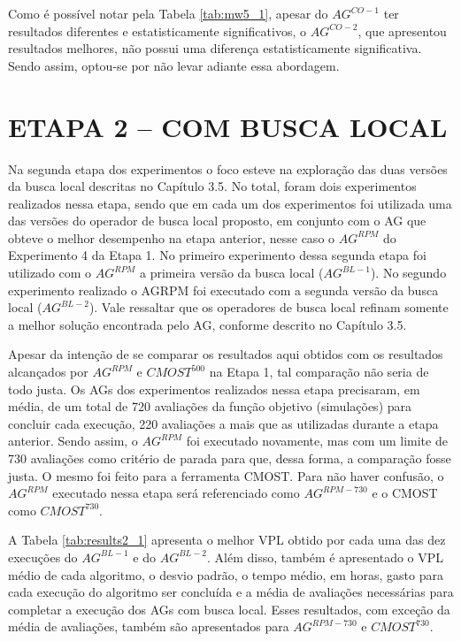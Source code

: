 Como é possível notar pela Tabela \ref{tab:mw5_1}, apesar do $AG^{CO-1}$ ter resultados diferentes e estatisticamente significativos, o $AG^{CO-2}$, que apresentou resultados melhores, não possui uma diferença estatisticamente significativa. Sendo assim, optou-se por não levar adiante essa abordagem.

\section{ETAPA 2 – COM BUSCA LOCAL}

Na segunda etapa dos experimentos o foco esteve na exploração das duas versões da busca local descritas no Capítulo 3.5. No total, foram dois experimentos realizados nessa etapa, sendo que em cada um dos experimentos foi utilizada uma das versões do operador de busca local proposto, em conjunto com o AG que obteve o melhor desempenho na etapa anterior, nesse caso o $AG^{RPM}$ do Experimento 4 da Etapa 1. No primeiro experimento dessa segunda etapa foi utilizado com o $AG^{RPM}$ a primeira versão da busca local ($AG^{BL-1}$). No segundo experimento realizado o AGRPM foi executado com a segunda versão da busca local ($AG^{BL-2}$). Vale ressaltar que os operadores de busca local refinam somente a melhor solução encontrada pelo AG, conforme descrito no Capítulo 3.5.

Apesar da intenção de se comparar os resultados aqui obtidos com os resultados alcançados por $AG^{RPM}$ e  $CMOST^{500}$ na Etapa 1, tal comparação não seria de todo justa. Os AGs dos experimentos realizados nessa etapa precisaram, em média, de um total de 720 avaliações da função objetivo (simulações) para concluir cada execução, 220 avaliações a mais que as utilizadas durante a etapa anterior. Sendo assim, o $AG^{RPM}$ foi executado novamente, mas com um limite de 730 avaliações como critério de parada para que, dessa forma, a comparação fosse justa. O mesmo foi feito para a ferramenta CMOST. Para não haver confusão, o $AG^{RPM}$ executado nessa etapa será referenciado como $AG^{RPM-730}$ e o CMOST como $CMOST^{730}$. 

A Tabela \ref{tab:results2_1} apresenta o melhor VPL obtido por cada uma das dez execuções do $AG^{BL-1}$ e do $AG^{BL-2}$. Além disso, também é apresentado o VPL médio de cada algoritmo, o desvio padrão, o tempo médio, em horas, gasto para cada execução do algoritmo ser concluída e a média de avaliações necessárias para completar a execução dos AGs com busca local. Esses resultados, com exceção da média de avaliações, também são apresentados para $AG^{RPM-730}$ e $CMOST^730$.

